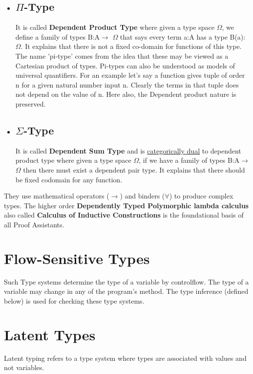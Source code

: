 \begin{itemize}
	\item{
	\subsection{ $\Pi$-Type}
	It is called \textbf{Dependent Product Type} where given a type space $\Omega$, we define a family of types B:A$\rightarrow$ $\Omega$ that says every term a:A has a type B(a):$\Omega$. It explains that there is not a fixed co-domain for functions of this type. The name 'pi-type' comes from the idea that these may be viewed as a Cartesian product of types. Pi-types can also be understood as models of universal quantifiers. For an example let's say a function gives tuple of order n for a given natural number input n. Clearly the terms in that tuple does not depend on the value of n. Here also, the Dependent product nature is preserved.\\   
	}
	\item{
	\subsection{ $\Sigma$-Type}
	It is called \textbf{Dependent Sum Type} and is \underline{categorically dual} to dependent product type where given a type space $\Omega$, if we have a family of types B:A$\rightarrow$ $\Omega$ then there must exist a dependent pair type. It explains that there should be fixed codomain for any function. \\ 
	}
\end{itemize}

They use mathematical operators ($\rightarrow$) and binders ($\forall$) to produce complex types. The higher order \textbf{Dependently Typed Polymorphic lambda calculus} also called \textbf{Calculus of Inductive Constructions} is the foundational basis of all Proof Assistants.

\section{Flow-Sensitive Types}
Such Type systems determine the type of a variable by controlflow. The type of a variable may change in any of the program's method. The type inference (defined below) is used for checking these type systems.

\section{Latent Types}
Latent typing refers to a type system where types are associated with values and not variables.

